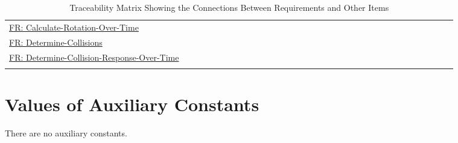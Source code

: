 \documentclass[12pt]{article}
\begin{document}
\begin{longtable}{l l l l l l l l l l l l l l l l l l l l l l l l l l l l l l l l l}
\\
\hyperref[calcRotOverTime]{FR: Calculate-Rotation-Over-Time} &  &  &  &  &  &  &  &  &  &  &  &  &  &  &  &  &  &  &  &  &  &  &  &  &  &  &  &  &  &  &  & 
\\
\hyperref[deterColls]{FR: Determine-Collisions} &  &  &  &  &  &  &  &  &  &  &  &  &  &  &  &  &  &  &  &  &  &  &  &  &  &  &  &  &  &  &  & 
\\
\hyperref[deterCollRespOverTime]{FR: Determine-Collision-Response-Over-Time} &  &  &  &  &  &  &  &  &  &  &  &  &  &  &  &  &  &  &  &  &  &  &  &  &  &  &  &  &  &  &  & 
\\
\bottomrule
\caption{Traceability Matrix Showing the Connections Between Requirements and Other Items}
\label{Table:TraceMatAllvsR}
\end{longtable}
\section{Values of Auxiliary Constants}
\label{Sec:AuxConstants}
There are no auxiliary constants.
\end{document}
